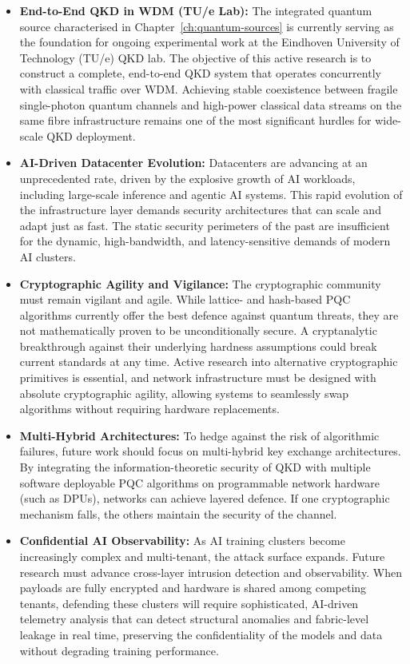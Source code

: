 \begin{itemize}
    \item \textbf{End-to-End QKD in WDM (TU/e Lab):} The integrated quantum source characterised in Chapter~\ref{ch:quantum-sources} is currently serving as the foundation for ongoing experimental work at the Eindhoven University of Technology (TU/e) QKD lab. The objective of this active research is to construct a complete, end-to-end QKD system that operates concurrently with classical traffic over WDM. Achieving stable coexistence between fragile single-photon quantum channels and high-power classical data streams on the same fibre infrastructure remains one of the most significant hurdles for wide-scale QKD deployment.
    
    \item \textbf{AI-Driven Datacenter Evolution:} Datacenters are advancing at an unprecedented rate, driven by the explosive growth of AI workloads, including large-scale inference and agentic AI systems. This rapid evolution of the infrastructure layer demands security architectures that can scale and adapt just as fast. The static security perimeters of the past are insufficient for the dynamic, high-bandwidth, and latency-sensitive demands of modern AI clusters.
    
    \item \textbf{Cryptographic Agility and Vigilance:} The cryptographic community must remain vigilant and agile. While lattice- and hash-based PQC algorithms currently offer the best defence against quantum threats, they are not mathematically proven to be unconditionally secure. A cryptanalytic breakthrough against their underlying hardness assumptions could break current standards at any time. Active research into alternative cryptographic primitives is essential, and network infrastructure must be designed with absolute cryptographic agility, allowing systems to seamlessly swap algorithms without requiring hardware replacements.
    
    \item \textbf{Multi-Hybrid Architectures:} To hedge against the risk of algorithmic failures, future work should focus on multi-hybrid key exchange architectures. By integrating the information-theoretic security of QKD with multiple software deployable PQC algorithms on programmable network hardware (such as DPUs), networks can achieve layered defence. If one cryptographic mechanism falls, the others maintain the security of the channel.
    
    \item \textbf{Confidential AI Observability:} As AI training clusters become increasingly complex and multi-tenant, the attack surface expands. Future research must advance cross-layer intrusion detection and observability. When payloads are fully encrypted and hardware is shared among competing tenants, defending these clusters will require sophisticated, AI-driven telemetry analysis that can detect structural anomalies and fabric-level leakage in real time, preserving the confidentiality of the models and data without degrading training performance.
\end{itemize}


